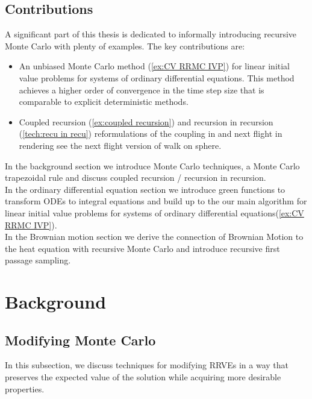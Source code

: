 \documentclass[a4paper,12pt]{article}
\begin{document}



\subsection{Contributions}
A significant part of this thesis is dedicated to informally introducing recursive Monte Carlo
with plenty of examples. The key contributions are:

\begin{itemize}
    \item An unbiased Monte Carlo method (\ref{ex:CV RRMC IVP}) for
          linear initial value problems for systems of ordinary
          differential equations. This method achieves a higher order of convergence
          in the time step size that is comparable to explicit deterministic methods.
    \item Coupled recursion (\ref{ex:coupled recursion}) and
          recursion in recursion (\ref{tech:recu in recu}) reformulations of the coupling in
          \cite{vicini_path_2021} and next flight in rendering see \cite{sawhney_grid-free_2022}
          the next flight version of walk on sphere.
\end{itemize}

In the background section we introduce Monte Carlo techniques, a
Monte Carlo trapezoidal rule and discuss
coupled recursion / recursion in recursion. \\

In the ordinary differential equation section we introduce green functions
to transform ODEs to integral equations and
build up to the our main algorithm for linear initial
value problems for systems of ordinary differential equations(\ref{ex:CV RRMC IVP}). \\

In the Brownian motion section we derive the connection of Brownian
Motion to the heat equation with recursive Monte Carlo and
introduce recursive first passage sampling. \\



\section{Background}



\subsection{Modifying Monte Carlo}
In this subsection, we discuss techniques for modifying RRVEs
in a way that preserves the expected value of the solution while
acquiring more desirable properties. \\
\end{document}
